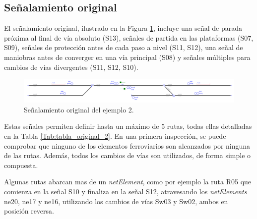 \subsection{Señalamiento original}

    El señalamiento original, ilustrado en la Figura \ref{fig:EJ1_2}, incluye una señal de parada próxima al final de vía absoluto (S13), señales de partida en las plataformas (S07, S09), señales de protección antes de cada paso a nivel (S11, S12), una señal de maniobras antes de converger en una vía principal (S08) y señales múltiples para cambios de vías divergentes (S11, S12, S10).
    
    \begin{figure}[H]
    	\centering
    	\includegraphics[width=1\textwidth]{resultados-obtenidos/ejemplo2/images/2_original.png}
    	\centering\caption{Señalamiento original del ejemplo 2.}
    	\label{fig:EJ1_2}
    \end{figure}
    
    Estas señales permiten definir hasta un máximo de 5 rutas, todas ellas detalladas en la Tabla \ref{Tab:tabla_original_2}. En una primera inspección, se puede comprobar que ninguno de los elementos ferroviarios son alcanzados por ninguna de las rutas. Además, todos los cambios de vías son utilizados, de forma simple o compuesta. 
    
    \begin{table}[H]
        {
        \caption{Tabla de enclavamiento original del ejemplo 2.}
        \label{Tab:tabla_original_2}
        \centering
     }
    \end{table}
    
    Algunas rutas abarcan mas de un \textit{netElement}, como por ejemplo la ruta R05 que comienza en la señal S10 y finaliza en la señal S12, atravesando los \textit{netElements} ne20, ne17 y ne16, utilizando los cambios de vías Sw03 y Sw02, ambos en posición reversa.